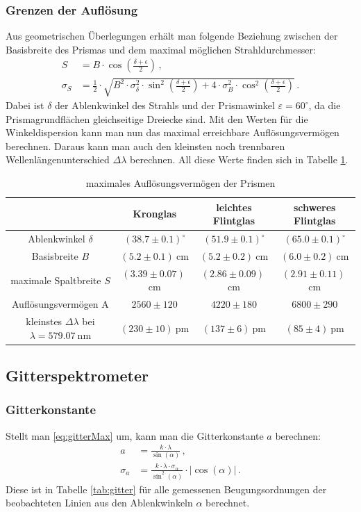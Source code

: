 \documentclass[12pt,a4paper,titlepage,headinclude,bibtotoc]{scrartcl}
\begin{document}
\subsubsection{Grenzen der Auflösung}
Aus geometrischen Überlegungen erhält man folgende Beziehung zwischen der Basisbreite des Prismas und dem maximal möglichen Strahldurchmesser:
\begin{align}
	S&=B \cdot \cos{\left (\frac{\delta+\epsilon}{2}\right )}\,,\\
\sigma_{S}&=\frac{1}{2} \cdot \sqrt{B^{2} \cdot \sigma_{\delta}^{2} \cdot \sin^{2}{\left (\frac{\delta+\epsilon}{2} \right )} + 4 \cdot \sigma_{B}^{2} \cdot \cos^{2}{\left (\frac{\delta+\epsilon}{2} \right )}}\,.
\end{align}
Dabei ist $\delta$ der Ablenkwinkel des Strahls und der Prismawinkel $\varepsilon=60^\circ$, da die Prismagrundflächen gleichseitige Dreiecke sind.
Mit den Werten für die Winkeldispersion kann man nun das maximal erreichbare Auflösungsvermögen berechnen.
Daraus kann man auch den kleinsten noch trennbaren Wellenlängenunterschied $\Delta\lambda$ berechnen.
All diese Werte finden sich in Tabelle \ref{tab:maxAP}.

\begin{table}[!htb]
	\centering
	\begin{tabular}{|c|c|c|c|}
		\hline		
		& Kronglas & leichtes Flintglas & schweres Flintglas \\
		\hline
	    Ablenkwinkel $\delta$ & $(38.7\pm 0.1)^\circ$ &  $(51.9\pm 0.1)^\circ$ & $(65.0\pm 0.1)^\circ$ \\
	    Basisbreite $B$ & $(5.2 \pm 0.1)~$cm & $(5.2 \pm 0.2)~$cm &$(6.0 \pm 0.2)~$cm \\
	    maximale Spaltbreite $S$ & $(3.39 \pm 0.07)~$cm & $(2.86 \pm 0.09)~$cm & $(2.91 \pm 0.11)~$cm \\
	    Auflösungsvermögen A& $2560 \pm 120$ & $4220 \pm 180$ & $6800 \pm 290$ \\
		kleinstes $\Delta \lambda$ bei $\lambda=579.07~$nm& $(230 \pm 10)~$pm & $(137 \pm 6)~$pm& $(85 \pm 4)~$pm \\
		\hline
	\end{tabular}
	\caption{maximales Auflösungsvermögen der Prismen}
	\label{tab:maxAP}
\end{table}

\subsection{Gitterspektrometer}
\subsubsection{Gitterkonstante}
Stellt man \eqref{eq:gitterMax} um, kann man die Gitterkonstante $a$ berechnen:
\begin{align}
	a&=\frac{k \cdot \lambda}{\sin{\left (\alpha \right )}}\,,\\
	\sigma_{a}&=\frac{k \cdot \lambda \cdot \sigma_{\alpha}}{\sin^{2}{\left (\alpha \right )}} \cdot \left\lvert{\cos{\left (\alpha \right )}}\right\rvert\,.
\end{align}
Diese ist in Tabelle \ref{tab:gitter} für alle gemessenen Beugungsordnungen der beobachteten Linien aus den Ablenkwinkeln $\alpha$ berechnet.
\end{document}
